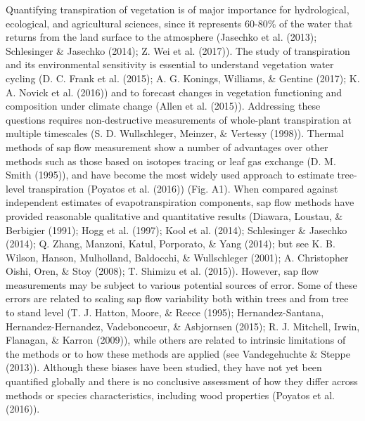 \documentclass[11pt,twoside]{reedthesis}
\begin{document}
Quantifying transpiration of vegetation is of major importance for
hydrological, ecological, and agricultural sciences, since it represents
60-80\% of the water that returns from the land surface to the
atmosphere (Jasechko et al. (2013); Schlesinger \& Jasechko (2014); Z.
Wei et al. (2017)). The study of transpiration and its environmental
sensitivity is essential to understand vegetation water cycling (D. C.
Frank et al. (2015); A. G. Konings, Williams, \& Gentine (2017); K. A.
Novick et al. (2016)) and to forecast changes in vegetation functioning
and composition under climate change (Allen et al. (2015)). Addressing
these questions requires non-destructive measurements of whole-plant
transpiration at multiple timescales (S. D. Wullschleger, Meinzer, \&
Vertessy (1998)). Thermal methods of sap flow measurement show a number
of advantages over other methods such as those based on isotopes tracing
or leaf gas exchange (D. M. Smith (1995)), and have become the most
widely used approach to estimate tree-level transpiration (Poyatos et
al. (2016)) (Fig. A1). When compared against independent estimates of
evapotranspiration components, sap flow methods have provided reasonable
qualitative and quantitative results (Diawara, Loustau, \& Berbigier
(1991); Hogg et al. (1997); Kool et al. (2014); Schlesinger \& Jasechko
(2014); Q. Zhang, Manzoni, Katul, Porporato, \& Yang (2014); but see K.
B. Wilson, Hanson, Mulholland, Baldocchi, \& Wullschleger (2001); A.
Christopher Oishi, Oren, \& Stoy (2008); T. Shimizu et al. (2015)).
However, sap flow measurements may be subject to various potential
sources of error. Some of these errors are related to scaling sap flow
variability both within trees and from tree to stand level (T. J.
Hatton, Moore, \& Reece (1995); Hernandez-Santana, Hernandez-Hernandez,
Vadeboncoeur, \& Asbjornsen (2015); R. J. Mitchell, Irwin, Flanagan, \&
Karron (2009)), while others are related to intrinsic limitations of the
methods or to how these methods are applied (see Vandegehuchte \& Steppe
(2013)). Although these biases have been studied, they have not yet been
quantified globally and there is no conclusive assessment of how they
differ across methods or species characteristics, including wood
properties (Poyatos et al. (2016)).\par
\end{document}
